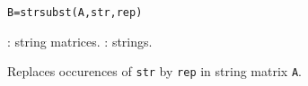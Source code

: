 
\begin{mandesc}
\end{mandesc}
\begin{calling_sequence}
\begin{verbatim}
B=strsubst(A,str,rep)
\end{verbatim}
\end{calling_sequence}

\begin{parameters}
  \begin{varlist}
     : string matrices.
     : strings.
  \end{varlist}
\end{parameters}

\begin{mandescription}
Replaces occurences of \verb+str+ by \verb+rep+ in string matrix \verb+A+.
\end{mandescription}

